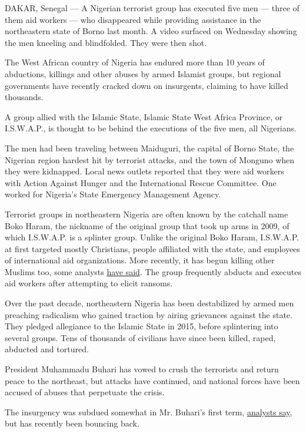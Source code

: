 DAKAR, Senegal --- A Nigerian terrorist group has executed five men ---
three of them aid workers --- who disappeared while providing assistance
in the northeastern state of Borno last month. A video surfaced on
Wednesday showing the men kneeling and blindfolded. They were then shot.

The West African country of Nigeria has endured more than 10 years of
abductions, killings and other abuses by armed Islamist groups, but
regional governments have recently cracked down on insurgents, claiming
to have killed thousands.

A group allied with the Islamic State, Islamic State West Africa
Province, or I.S.W.A.P., is thought to be behind the executions of the
five men, all Nigerians.

The men had been traveling between Maiduguri, the capital of Borno
State, the Nigerian region hardest hit by terrorist attacks, and the
town of Monguno when they were kidnapped. Local news outlets reported
that they were aid workers with Action Against Hunger and the
International Rescue Committee. One worked for Nigeria's State Emergency
Management Agency.

Terrorist groups in northeastern Nigeria are often known by the catchall
name Boko Haram, the nickname of the original group that took up arms in
2009, of which I.S.W.A.P. is a splinter group. Unlike the original Boko
Haram, I.S.W.A.P. at first targeted mostly Christians, people affiliated
with the state, and employees of international aid organizations. More
recently, it has begun killing other Muslims too, some analysts
\href{https://www.cfr.org/blog/iswas-recent-attacks-could-signal-new-deadlier-approach-nigeria?utm_medium=social_share\&utm_source=tw}{have
said}. The group frequently abducts and executes aid workers after
attempting to elicit ransoms.

Over the past decade, northeastern Nigeria has been destabilized by
armed men preaching radicalism who gained traction by airing grievances
against the state. They pledged allegiance to the Islamic State in 2015,
before splintering into several groups. Tens of thousands of civilians
have since been killed, raped, abducted and tortured.

President Muhammadu Buhari has vowed to crush the terrorists and return
peace to the northeast, but attacks have continued, and national forces
have been accused of abuses that perpetuate the crisis.

The insurgency was subdued somewhat in Mr. Buhari's first term,
\href{https://twitter.com/bulamabukarti/status/1271344075170611201}{analysts
say}, but has recently been bouncing back.

